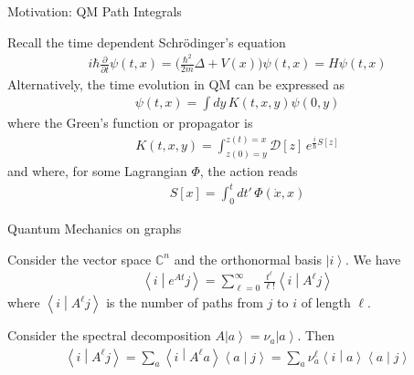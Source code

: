 \documentclass{beamer}
\newcommand{\ket}[1]{\left| #1 \right\rangle}
\newcommand{\braket}[2]{\left\langle #1 \middle| #2  \right\rangle}
\begin{document}
\begin{frame}{Motivation: QM Path Integrals}

Recall the time dependent Schr\"odinger's equation
\begin{eqnarray}
i\hbar
\frac{\partial}{\partial t}
\psi(t,x)
=
\bigg(
\frac{\hbar^2}{2m}
\Delta
+
V(x)
\bigg)
\psi(t,x)
=
H
\psi(t,x)
\end{eqnarray}
Alternatively, the time evolution in QM can be expressed as
\begin{eqnarray}
\psi(t,x)
=
\int dy\,
K(t,x,y)
\psi(0,y)
\end{eqnarray}
where the Green's function or propagator is
\begin{eqnarray}
K(t,x,y)
=
\int_{z(0)=y}^{z(t)=x} \mathcal{D}[z]\,
e^{\frac{i}{\hbar}S[z]}
\end{eqnarray}
and where, for some Lagrangian $\Phi$,
the action reads
\begin{eqnarray}
S[x]
=
\int_0^t dt'\,
\Phi(\dot{x},x)
\end{eqnarray}

\end{frame}


\begin{frame}{Quantum Mechanics on graphs}

Consider the vector space $\mathbb{C}^n$ and the orthonormal basis $\ket{i}$.
We have
\begin{eqnarray}
\braket{i}{e^{At} j}
=
\sum_{\ell=0}^{\infty}
\frac{t^{\ell}}{\ell!}
\braket{i}{A^{\ell} j}
\end{eqnarray}
where 
$\braket{i}{A^{\ell}j}$ 
is the number of paths from $j$ to $i$ of length $\ell$.

\vspace{.25cm}

Consider the spectral decomposition
$A
\ket{a}
=
\nu_a
\ket{a}$.
Then
\begin{eqnarray}
\braket{i}{A^{\ell} j}
=
\sum_a
\braket{i}{A^{\ell} a}
\braket{a}{j}
=
\sum_a
\nu_a^{\ell}
\braket{i}{a}
\braket{a}{j}
\end{eqnarray}

\end{frame}


\end{document}
